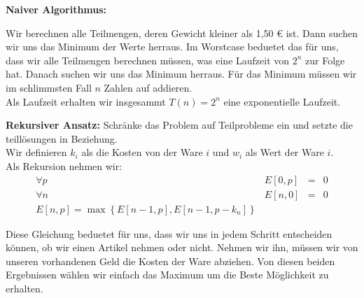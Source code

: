 \begin{description}

\item{\bfseries Naiver Algorithmus:}

Wir berechnen alle Teilmengen, deren Gewicht kleiner als 1,50 \euro{} ist. Dann suchen wir uns das Minimum der Werte herraus. Im Worstcase beduetet das für uns, dass wir alle Teilmengen berechnen müssen, was eine Laufzeit von $2^n$ zur Folge hat. Danach suchen wir uns das Minimum herraus.
Für das Minimum müssen wir im schlimmsten Fall $n$ Zahlen auf addieren.\\

Als Laufzeit erhalten wir insgesammt $T(n) = 2^n$ eine exponentielle Laufzeit.

\item{\bfseries Rekursiver Ansatz:} Schränke das Problem auf Teilprobleme ein und setzte die teillösungen in Beziehung.\\

Wir definieren $k_i$ als die Kosten von der Ware $i$ und $w_i$ als Wert der Ware $i$.\\
Als Rekursion nehmen wir:
$$
\begin{array}{lrcl}
\forall p  & E[0,p] & = & 0\\
\forall n & E[n,0]&=& 0\\
E[n,p] = \max \left\{ E[n-1, p] , E[n-1, p - k_n] \right\}
\end{array}
$$

Diese Gleichung beduetet für uns, dass wir uns in jedem Schritt entscheiden können, ob wir einen Artikel nehmen oder nicht. Nehmen wir ihn, müssen wir von unseren vorhandenen Geld die Kosten der Ware abziehen. Von diesen beiden Ergebnissen wählen wir einfach das Maximum um die Beste Möglichkeit zu erhalten.
\end{description}